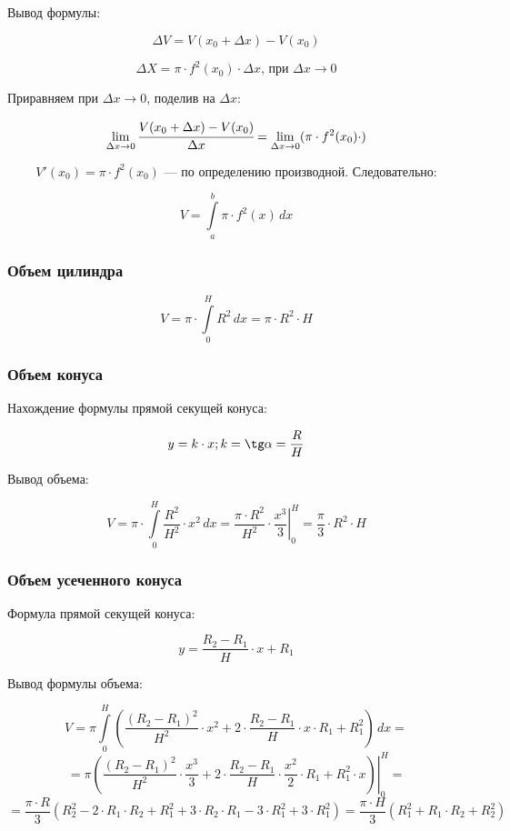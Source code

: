 \documentclass[12pt,a4paper]{article}
\begin{document}
Вывод формулы:

$$ \Delta V = V(x_0 + \Delta x) - V(x_0) $$

$$ \Delta X = \pi\cdot f^2(x_0)\cdot \Delta x \text{,\ при\ } \Delta x \rightarrow 0 $$

Приравняем при $ \Delta x \rightarrow 0 $, поделив на $ \Delta x $:

$$ \lim_{\Delta x \to 0} \cfrac{V(x_0 + \Delta x) - V(x_0)}{\Delta x} = \lim_{\Delta x \to 0} (\pi\cdot f^2(x_0)\cdot) $$

$$ V'(x_0) = \pi\cdot f^2(x_0) \text{ --- по определению производной. Следовательно:} $$

$$ \boxed{V = \int\limits_a^b \pi\cdot f^2(x)\, dx} $$

\subsubsection{Объем цилиндра}

$$ V = \pi \cdot \int\limits_0^H R^2\, dx = \pi\cdot R^2\cdot H $$

\subsubsection{Объем конуса}

Нахождение формулы прямой секущей конуса:

$$ y = k\cdot x; k = \tg \alpha = \frac{R}{H} $$

Вывод объема:

$$ V = \pi\cdot \int\limits_0^H \frac{R^2}{H^2}\cdot x^2\, dx = \frac{\pi\cdot R^2}{H^2}\cdot \left. \frac{x^3}{3}\right|_0^H = \frac{\pi}{3}\cdot R^2\cdot H $$

\subsubsection{Объем усеченного конуса}

Формула прямой секущей конуса:

$$ y = \frac{R_2-R_1}{H}\cdot x + R_1 $$

Вывод формулы объема:

$$ V = \pi \int\limits_0^H \left( \frac{(R_2-R_1)^2}{H^2}\cdot x^2 + 2\cdot \frac{R_2-R_1}{H}\cdot x\cdot R_1 + R_1^2 \right)\, dx = $$ $$ = \pi \left. \left( \frac{(R_2-R_1)^2}{H^2}\cdot \frac{x^3}{3} + 2\cdot \frac{R_2-R_1}{H}\cdot \frac{x^2}{2}\cdot R_1 + R_1^2\cdot x \right)\right|_0^H = $$ $$ = \frac{\pi\cdot R}{3}(R_2^2 - 2\cdot R_1\cdot R_2 + R_1^2 + 3\cdot R_2\cdot R_1 - 3\cdot R_1^2 + 3\cdot R_1^2) = \boxed{\frac{\pi\cdot H}{3}(R_1^2 + R_1\cdot R_2 + R_2^2)} $$
\end{document}
